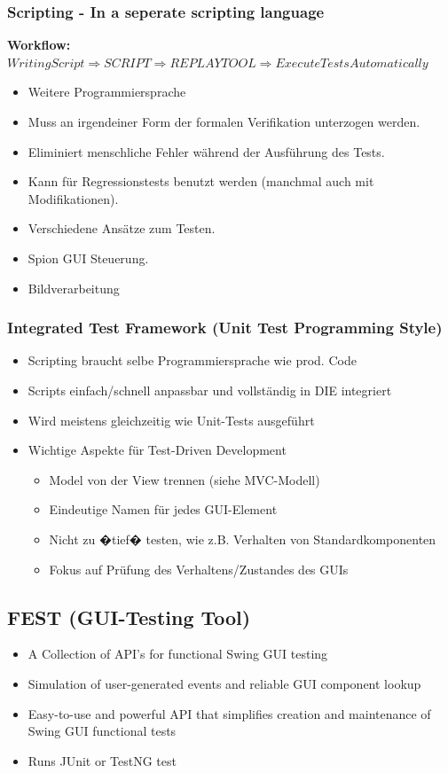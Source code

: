 \documentclass[a4paper,10pt]{article}
\newcommand{\Bold}[1]{\textbf{#1}} %
\begin{document}
\subsubsection{Scripting - In a seperate scripting language}
\textbf{\Bold Workflow:} $Writing Script \Longrightarrow SCRIPT \Longrightarrow REPLAY TOOL \Longrightarrow Execute Tests Automatically$

\begin{itemize}
\item Weitere Programmiersprache
\item Muss an irgendeiner Form der formalen Verifikation unterzogen werden.
\item Eliminiert menschliche Fehler w\"{a}hrend der Ausf\"{u}hrung des Tests.
\item Kann f\"{u}r Regressionstests benutzt werden (manchmal auch mit Modifikationen).
\item Verschiedene Ans\"{a}tze zum Testen.
\item Spion GUI Steuerung.
\item Bildverarbeitung
\end{itemize}

\subsubsection{Integrated Test Framework (Unit Test Programming Style)}
\begin{itemize}
\item Scripting braucht selbe Programmiersprache wie prod. Code
\item Scripts einfach/schnell anpassbar und vollst\"{a}ndig in DIE integriert
\item Wird meistens gleichzeitig wie Unit-Tests ausgef\"{u}hrt
\item Wichtige Aspekte f\"{u}r Test-Driven Development
\begin{itemize}
\item Model von der View trennen (siehe MVC-Modell)
\item Eindeutige Namen f\"{u}r jedes GUI-Element
\item Nicht zu �tief� testen, wie z.B. Verhalten von Standardkomponenten
\item Fokus auf Pr\"{u}fung des Verhaltens/Zustandes des GUIs
\end{itemize}
\end{itemize}

\subsection{FEST (GUI-Testing Tool)}
\begin{itemize}
\item A Collection of API's for functional Swing GUI testing
\item Simulation of user-generated events and reliable GUI component lookup
\item Easy-to-use and powerful API that simplifies creation and maintenance of Swing GUI functional tests
\item Runs JUnit or TestNG test
\end{itemize}
\end{document}
